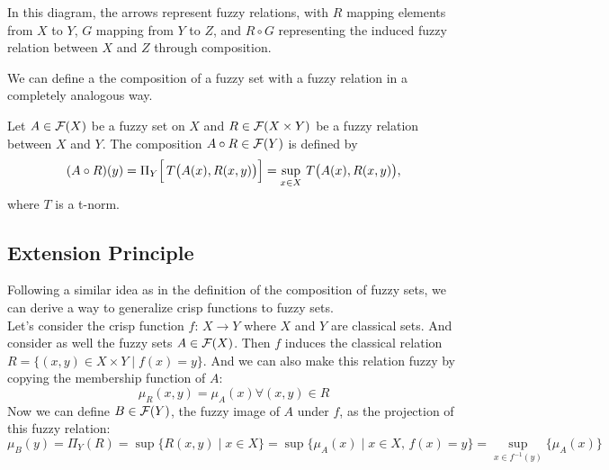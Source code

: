 \noindent
\begin{minipage}{0.7\textwidth}
In this diagram, the arrows represent fuzzy relations, with \(R\) mapping elements from \(X\) to \(Y\), \(G\) mapping from \(Y\) to \(Z\), and \(R \circ G\) representing the induced fuzzy relation between \(X\) and \(Z\) through composition.\\
\end{minipage}%
\begin{minipage}{0.3\textwidth}
  \begin{center}
  \end{center}

\end{minipage}


We can define a the composition of a fuzzy set with a fuzzy relation in a completely analogous way. 

\begin{definition}
    Let \( A \in \mathcal{F}(X) \) be a fuzzy set on \(X\) and \( R \in \mathcal{F}(X \times Y) \) be a fuzzy relation between \(X\) and \(Y\). The composition \( A \circ R \in \mathcal{F}(Y) \) is defined by
    \[
    (A \circ R)(y) = \Pi_{Y}\Bigl[\, T\bigl( A(x), R(x,y) \bigr) \Bigr] = \sup_{x \in X}\, T\bigl( A(x), R(x,y) \bigr),
    \]
    where \(T\) is a t-norm.
\end{definition}



\subsection{Extension Principle}

Following a similar idea as in the definition of the composition of fuzzy sets, we can derive a way to generalize crisp functions  to fuzzy sets.\\

Let's consider the crisp function $f:\,X \longrightarrow Y$ where $X$ and $Y$ are classical sets. And consider as well the fuzzy sets $A \in \mathcal{F}(X)$. Then $f$ induces the classical relation $R=\{(x,y)\in X\times Y \mid f(x)=y\}$. And we can also make this relation fuzzy by copying the membership function of $A$:
$$ \mu_R (x,y) = \mu_A (x) \forall (x,y)\in R$$
Now we can define $B\in\mathcal{F}(Y)$, the fuzzy image of $A$ under $f$, as the projection of this fuzzy relation:
$$\mu_B (y) = \Pi_Y (R) = \sup\{R(x,y)\mid x\in X\} = \sup\{\mu_A (x)\mid x\in X, \, f(x)= y\} = \sup_{x\in f^{-1}(y)}\{\mu_A(x)\}$$

